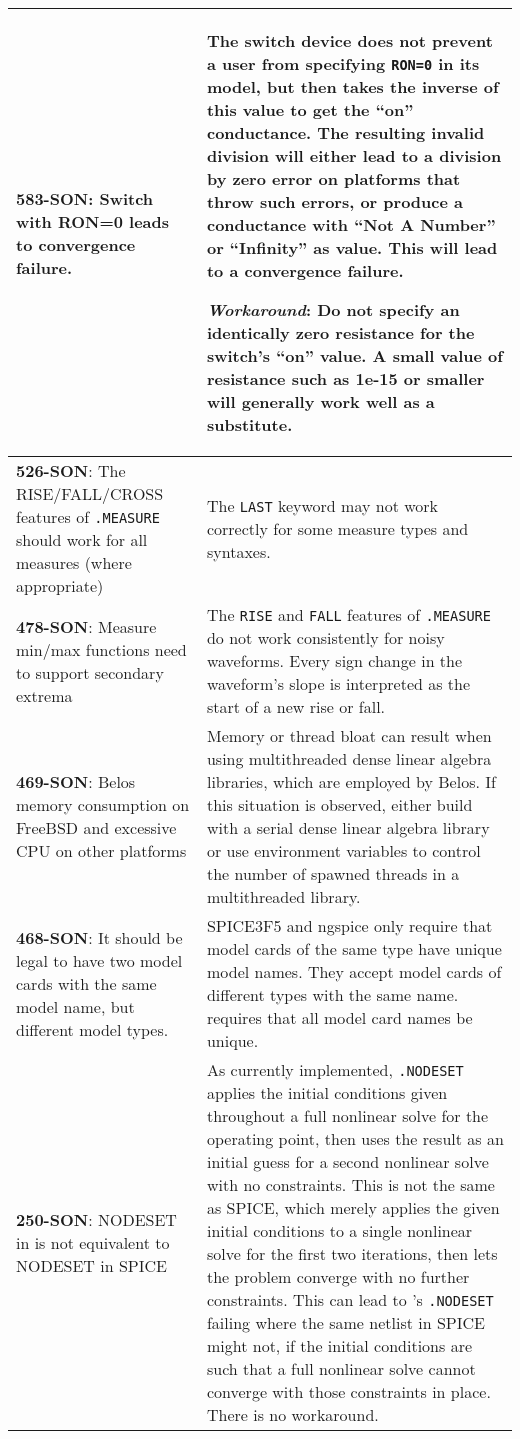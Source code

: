{\begin{longtable}[h] {>{\raggedright\small}m{2in}|>{\raggedright\let\\\tabularnewline\small}m{3.5in}}
\textbf{583-SON}: Switch with RON=0 leads to convergence failure. &  The switch device does not prevent a user from specifying \texttt{RON=0} in its model, but then takes the inverse of this value to get the ``on'' conductance.  The resulting invalid division will either lead to a division by zero error on platforms that throw such errors, or produce a conductance with ``Not A Number'' or ``Infinity'' as value.  This will lead to a convergence failure.

\textbf{\textit{Workaround}}: Do not specify an identically zero resistance for the switch's ``on'' value.  A small value of resistance such as 1e-15 or smaller will generally work well as a substitute. \\ \hline

\textbf{526-SON}: The RISE/FALL/CROSS features of \texttt{.MEASURE} should work for all
measures (where appropriate) & The \texttt{LAST} keyword may not work correctly for
some measure types and syntaxes.
\\ \hline 

\textbf{478-SON}: Measure min/max functions need to support secondary extrema &
The \texttt{RISE} and \texttt{FALL} features of \texttt{.MEASURE} do not work
consistently for noisy waveforms. Every sign change in the waveform’s slope
is interpreted as the start of a new rise or fall.
\\ \hline

\textbf{469-SON}: Belos memory consumption on FreeBSD and excessive CPU on other
platforms &
Memory or thread bloat can result when using multithreaded dense linear algebra
libraries, which are employed by Belos.  If this situation is observed, either build
\Xyce{} with a serial dense linear algebra library or use environment variables to control
the number of spawned threads in a multithreaded library.
\\ \hline


\textbf{468-SON}: It should be legal to have two model cards with the same model
name, but different model types. & SPICE3F5 and ngspice only require that
model cards of the same type have unique model names. They accept model cards
of different types with the same name.  \Xyce{} requires that all model card names be unique.
\\ \hline


\textbf{250-SON}: NODESET in \Xyce{} is not equivalent to NODESET in SPICE & As
currently implemented, \texttt{.NODESET} applies the initial conditions given throughout
a full nonlinear solve for the operating point, then uses the result as an
initial guess for a second nonlinear solve with no constraints.  This is not
the same as SPICE, which merely applies the given initial conditions to a
single nonlinear solve for the first two iterations, then lets the problem
converge with no further constraints.  This can lead to \Xyce{}'s \texttt{.NODESET} failing
where the same netlist in SPICE might not, if the initial conditions are such
that a full nonlinear solve cannot converge with those constraints in place.
There is no workaround.
\\ \hline


\end{longtable}}
